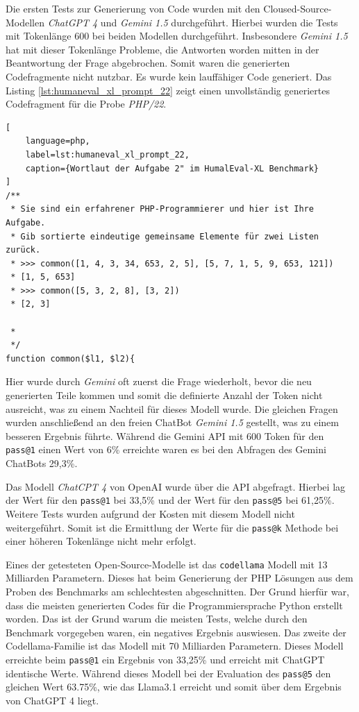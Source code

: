 Die ersten Tests zur Generierung von Code wurden mit den Cloused-Source-Modellen \textit{ChatGPT 4} und \textit{Gemini 1.5} durchgeführt. Hierbei wurden die Tests mit Tokenlänge 600 bei beiden Modellen durchgeführt. Insbesondere \textit{Gemini 1.5} hat mit dieser Tokenlänge Probleme, die Antworten worden mitten in der Beantwortung der Frage abgebrochen. Somit waren die generierten Codefragmente nicht nutzbar. Es wurde kein lauffähiger Code generiert. Das Listing \ref{lst:humaneval_xl_prompt_22} zeigt einen unvollständig generiertes Codefragment für die Probe \textit{PHP/22}.

\begin{lstlisting}[
	language=php,
	label=lst:humaneval_xl_prompt_22,
	caption={Wortlaut der Aufgabe 2" im HumalEval-XL Benchmark}
]
/**
 * Sie sind ein erfahrener PHP-Programmierer und hier ist Ihre Aufgabe.
 * Gib sortierte eindeutige gemeinsame Elemente für zwei Listen zurück.
 * >>> common([1, 4, 3, 34, 653, 2, 5], [5, 7, 1, 5, 9, 653, 121])
 * [1, 5, 653]
 * >>> common([5, 3, 2, 8], [3, 2])
 * [2, 3]

 *
 */
function common($l1, $l2){
\end{lstlisting}

Hier wurde durch \textit{Gemini} oft zuerst die Frage wiederholt, bevor die neu generierten Teile kommen und somit die definierte Anzahl der Token nicht ausreicht, was zu einem Nachteil für dieses Modell wurde. Die gleichen Fragen wurden anschließend an den freien ChatBot \textit{Gemini 1.5} gestellt, was zu einem besseren Ergebnis führte. Während die Gemini API mit 600 Token für den \texttt{pass@1} einen Wert von 6\% erreichte waren es bei den Abfragen des Gemini ChatBots 29,3\%.\vspace{0.2cm}

Das Modell \textit{ChatCPT 4} von OpenAI wurde über die API abgefragt. Hierbei lag der Wert für den \texttt{pass@1} bei 33,5\% und der Wert für den \texttt{pass@5} bei 61,25\%. Weitere Tests wurden aufgrund der Kosten mit diesem Modell nicht weitergeführt. Somit ist die Ermittlung der Werte für die \texttt{pass@k} Methode bei einer höheren Tokenlänge nicht mehr erfolgt.\vspace{0.2cm}

Eines der getesteten Open-Source-Modelle ist das \texttt{codellama} Modell mit 13 Milliarden Parametern. Dieses hat beim Generierung der PHP Lösungen aus dem Proben des Benchmarks am schlechtesten abgeschnitten. Der Grund hierfür war, dass die meisten generierten Codes für die Programmiersprache Python erstellt worden. Das ist der Grund warum die meisten Tests, welche durch den Benchmark vorgegeben waren, ein negatives Ergebnis auswiesen. Das zweite der Codellama-Familie ist das Modell mit 70 Milliarden Parametern. Dieses Modell erreichte beim \texttt{pass@1} ein Ergebnis von 33,25\% und erreicht mit ChatGPT identische Werte. Während dieses Modell bei der Evaluation des \texttt{pass@5} den gleichen Wert 63.75\%, wie das Llama3.1 erreicht und somit über dem Ergebnis von ChatGPT 4 liegt.\vspace{0.2cm}

